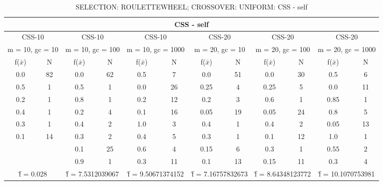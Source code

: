\begin{table}[H]
	\centering
	\caption{SELECTION: ROULETTEWHEEL; CROSSOVER: UNIFORM: CSS - self}
	\begin{adjustbox}{width=1\textwidth}
		\begin{tabular}{ |c|c||c|c||c|c||c|c||c|c||c|c| }
			\hline
			\multicolumn{12}{|c|}{CSS - self} \\
			\hline
			\multicolumn{2}{|c||}{CSS-10} & \multicolumn{2}{c||}{CSS-10} & \multicolumn{2}{c||}{CSS-10} & \multicolumn{2}{c||}{CSS-20} & \multicolumn{2}{c||}{CSS-20} & \multicolumn{2}{c|}{CSS-20}\\
			\hline
			\multicolumn{2}{|c||}{m = 10, gc = 10} & \multicolumn{2}{c||}{m = 10, gc = 100} & \multicolumn{2}{c||}{m = 10, gc = 1000} & \multicolumn{2}{c||}{m = 20, gc = 10} & \multicolumn{2}{c||}{m = 20, gc = 100} & \multicolumn{2}{c|}{m = 20, gc = 1000}\\
			\hline
			f($\bar{x}$) & N & f($\bar{x}$) & N & f($\bar{x}$) & N & f($\bar{x}$) & N & f($\bar{x}$) & N & f($\bar{x}$) & N\\
			\hline
			\hline
			0.0 & 82 & 0.0 & 62 & 0.5 & 7 & 0.0 & 51 & 0.0 & 30 & 0.5 & 6\\
			0.5 & 1 & 0.5 & 1 & 0.0 & 26 & 0.25 & 4 & 0.25 & 5 & 0.0 & 11\\
			0.2 & 1 & 0.8 & 1 & 0.2 & 12 & 0.2 & 3 & 0.6 & 1 & 0.85 & 1\\
			0.4 & 1 & 0.2 & 4 & 0.1 & 16 & 0.05 & 19 & 0.05 & 24 & 0.8 & 5\\
			0.3 & 1 & 0.4 & 2 & 1.0 & 3 & 0.4 & 1 & 0.4 & 2 & 0.05 & 13\\
			0.1 & 14 & 0.3 & 2 & 0.4 & 5 & 0.3 & 1 & 0.1 & 12 & 1.0 & 1\\
			&   & 0.1 & 25 & 0.6 & 4 & 0.15 & 6 & 0.3 & 1 & 0.55 & 2\\
			&   & 0.9 & 1 & 0.3 & 11 & 0.1 & 13 & 0.15 & 11 & 0.3 & 4\\
			\hline
			\multicolumn{2}{|c||}{\^{f} = 0.028} & \multicolumn{2}{c||}{\^{f} = 7.5312039067} & \multicolumn{2}{c||}{\^{f} = 9.50671374152} & \multicolumn{2}{c||}{\^{f} = 7.16757832673} & \multicolumn{2}{c||}{\^{f} = 8.64348123772} & \multicolumn{2}{c|}{\^{f} = 10.1070753981}\\
			\hline
		\end{tabular}
	\end{adjustbox}
\end{table}
